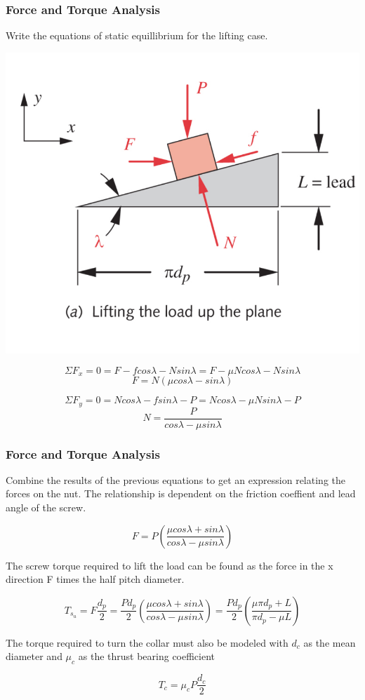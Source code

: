 \documentclass[fleqn]{beamer} %
\newcommand{\sectiontitleIII}{Force and Torque Analysis}
\begin{document}
	\begin{frame}[label=sectionIII] \footnotesize
		\frametitle{\sectiontitleIII}
		
		\begin{multicols}{2}
			Write the equations of static equillibrium for the lifting case.

			\includegraphics[scale=.12]{images/figure_15_6_a.png}
		\end{multicols}

			\[\Sigma F_x = 0 = F - f cos\lambda -N sin\lambda = F - \mu N cos\lambda - N sin\lambda \]	
			\[F=N(\mu cos\lambda-sin\lambda)\]	

			\[\Sigma F_y = 0 = N cos\lambda - f sin\lambda - P = N cos\lambda -\mu N sin\lambda - P \]
			\[N=\frac{P}{cos\lambda - \mu sin\lambda}\]
	        
	\end{frame}  

	\begin{frame}[label=sectionIII] \footnotesize
		\frametitle{\sectiontitleIII}
	 		
		Combine the results of the previous equations to get an expression relating the forces on the nut. The relationship is dependent on the friction coeffient and lead angle of the screw. 

		\[F = P \left( \frac{\mu cos\lambda +sin\lambda}{cos\lambda - \mu sin \lambda} \right)\]
		
		The screw torque required to lift the load can be found as the force in the x direction F times the half pitch diameter.  	

		\[T_{s_u} = F \frac{d_p}{2} = \frac{Pd_p}{2} \left( \frac{\mu cos\lambda +sin\lambda}{cos\lambda - \mu sin \lambda} \right) =  \frac{Pd_p}{2}\left(\frac{\mu \pi d_p +L}{\pi d_p -\mu L} \right) \] 

		The torque required to turn the collar must also be modeled with $d_c$ as the mean diameter and $\mu_c$ as the thrust bearing coefficient

		\[T_c=\mu_cP\frac{d_c}{2}\]

	\end{frame}  
\end{document}
